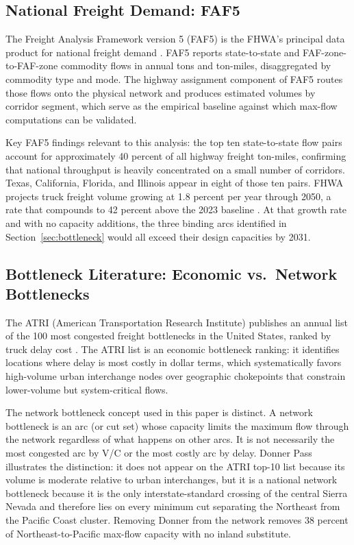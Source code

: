 \subsection{National Freight Demand: FAF5}

The Freight Analysis Framework version 5 (FAF5) is the FHWA's principal data product for national freight demand \citep{FAF5_2023}. FAF5 reports state-to-state and FAF-zone-to-FAF-zone commodity flows in annual tons and ton-miles, disaggregated by commodity type and mode. The highway assignment component of FAF5 routes those flows onto the physical network and produces estimated volumes by corridor segment, which serve as the empirical baseline against which max-flow computations can be validated.

Key FAF5 findings relevant to this analysis: the top ten state-to-state flow pairs account for approximately 40 percent of all highway freight ton-miles, confirming that national throughput is heavily concentrated on a small number of corridors. Texas, California, Florida, and Illinois appear in eight of those ten pairs. FHWA projects truck freight volume growing at 1.8 percent per year through 2050, a rate that compounds to 42 percent above the 2023 baseline \citep{FHWA_freight2023}. At that growth rate and with no capacity additions, the three binding arcs identified in Section~\ref{sec:bottleneck} would all exceed their design capacities by 2031.

\subsection{Bottleneck Literature: Economic vs.\ Network Bottlenecks}

The ATRI (American Transportation Research Institute) publishes an annual list of the 100 most congested freight bottlenecks in the United States, ranked by truck delay cost \citep{ATRI_costs2024}. The ATRI list is an economic bottleneck ranking: it identifies locations where delay is most costly in dollar terms, which systematically favors high-volume urban interchange nodes over geographic chokepoints that constrain lower-volume but system-critical flows.

The network bottleneck concept used in this paper is distinct. A network bottleneck is an arc (or cut set) whose capacity limits the maximum flow through the network regardless of what happens on other arcs. It is not necessarily the most congested arc by V/C or the most costly arc by delay. Donner Pass illustrates the distinction: it does not appear on the ATRI top-10 list because its volume is moderate relative to urban interchanges, but it is a national network bottleneck because it is the only interstate-standard crossing of the central Sierra Nevada and therefore lies on every minimum cut separating the Northeast from the Pacific Coast cluster. Removing Donner from the network removes 38 percent of Northeast-to-Pacific max-flow capacity with no inland substitute.

